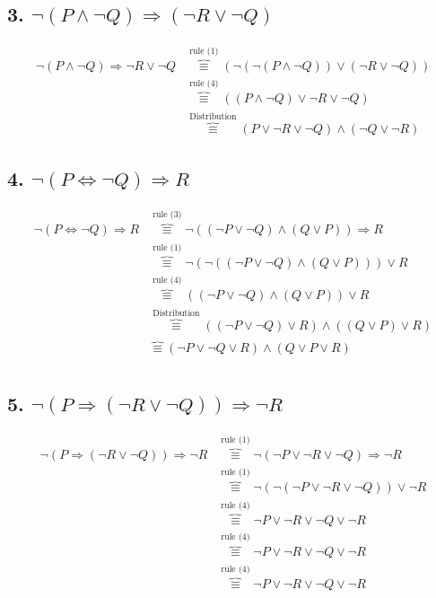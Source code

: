 \documentclass{article}
\begin{document}
\subsection{3. $\neg (P \land  \neg Q) \Rightarrow (\neg R\lor \neg Q)$}
\begin{equation}
    \begin{aligned}
        \neg (P \land \neg Q) \Rightarrow \neg R \lor \neg Q &\overbrace{\equiv}^{\text{rule (1)}} (\neg(\neg(P \land \neg Q)) \lor (\neg R \lor \neg Q))\\
        &\overbrace{\equiv}^{\text{rule (4)}} ((P \land \neg Q) \lor \neg R \lor \neg Q)\\
        &\overbrace{\equiv}^{\text{Distribution}} (P \lor \neg R \lor \neg Q) \land (\neg Q \lor \neg R)
    \end{aligned}
\end{equation}
\subsection{4. $\neg (P \iff \neg Q) \Rightarrow R$}
\begin{equation}
    \begin{aligned}
        \neg (P \iff \neg Q) \Rightarrow R &\overbrace{\equiv}^{\text{rule (3)}} \neg ((\neg P \lor \neg Q) \land (Q \lor P)) \Rightarrow R\\
        &\overbrace{\equiv}^{\text{rule (1)}} \neg (\neg(( \neg P \lor \neg Q) \land  (Q \lor P))) \lor R\\
        &\overbrace{\equiv}^{\text{rule (4)}} (( \neg P \lor \neg Q) \land  (Q \lor P)) \lor R\\
        &\overbrace{\equiv}^{\text{Distribution}} (( \neg P \lor \neg Q) \lor R) \land ( (Q \lor P) \lor R)\\
        &\overbrace{\equiv}^{\text{}} ( \neg P \lor \neg Q \lor R) \land ( Q \lor P \lor R)\\
    \end{aligned}
\end{equation}
\subsection{5. $\neg (P \Rightarrow (\neg R \lor \neg Q)) \Rightarrow \neg R$}
\begin{equation}
    \begin{aligned}
        \neg (P \Rightarrow (\neg R \lor \neg Q)) \Rightarrow \neg R &\overbrace{\equiv}^{\text{rule (1)}} \neg (\neg P \lor \neg R \lor \neg Q) \Rightarrow \neg R\\
        &\overbrace{\equiv}^{\text{rule (1)}} \neg (\neg (\neg P \lor \neg R \lor \neg Q)) \lor \neg R\\
        &\overbrace{\equiv}^{\text{rule (4)}} \neg P \lor \neg R \lor \neg Q \lor \neg R\\
        &\overbrace{\equiv}^{\text{rule (4)}} \neg P \lor \neg R \lor \neg Q \lor \neg R\\
        &\overbrace{\equiv}^{\text{rule (4)}} \neg P \lor \neg R \lor \neg Q \lor \neg R
    \end{aligned}
\end{equation}
\end{document}
